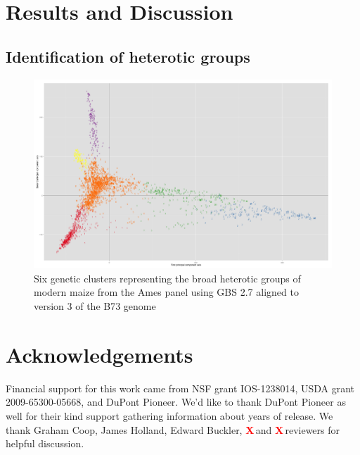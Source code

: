 \documentclass[9pt,twocolumn,twoside]{gsajnl}
\newcommand{\X}{\textcolor{red}{\bf X\,}}
\begin{document}


\section*{Results and Discussion}

\subsection{Identification of heterotic groups}

\begin{figure}[htbp]
\centering
\includegraphics[width=\linewidth]{6_clusters_placeholder.png}
\caption{Six genetic clusters representing the broad heterotic groups of modern maize from the Ames panel using GBS 2.7 aligned to version 3 of the B73 genome 
}
\label{fig:6clusters}
\end{figure}



\section*{Acknowledgements}
Financial support for this work came from NSF grant IOS-1238014, USDA grant 2009-65300-05668, and DuPont Pioneer.  We'd like to thank DuPont Pioneer as well for their kind support gathering information about years of release. We thank Graham Coop, James Holland, Edward Buckler, \X and \X reviewers for helpful discussion. 


\end{document}
